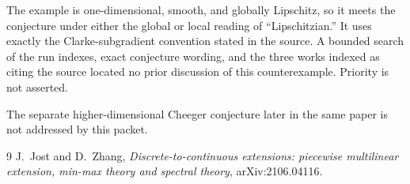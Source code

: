 \documentclass[11pt]{article}
\begin{document}
The example is one-dimensional, smooth, and globally Lipschitz, so it meets
the conjecture under either the global or local reading of ``Lipschitzian.''
It uses exactly the Clarke-subgradient convention stated in the source.  A
bounded search of the run indexes, exact conjecture wording, and the three
works indexed as citing the source located no prior discussion of this
counterexample.  Priority is not asserted.

The separate higher-dimensional Cheeger conjecture later in the same paper
is not addressed by this packet.

\begin{thebibliography}{9}
J.~Jost and D.~Zhang,
\emph{Discrete-to-continuous extensions: piecewise multilinear extension,
min-max theory and spectral theory},
arXiv:2106.04116.
\end{thebibliography}
\end{document}
